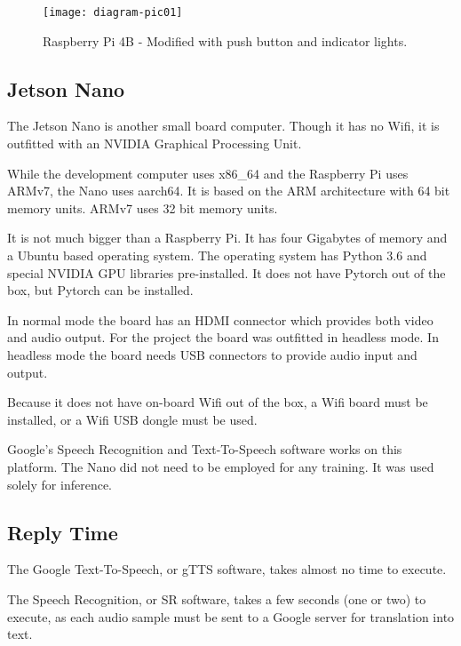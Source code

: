 \begin{figure}[H]
	\begin{center}
		\texttt{[image: diagram-pic01]}
		
		
	\end{center}
	\caption[Raspberry Pi]{Raspberry Pi 4B - Modified with push button and indicator lights.}
	
	
\end{figure}

\subsection{Jetson Nano}

The Jetson Nano is another small board computer. Though it has no Wifi, it is outfitted with an NVIDIA Graphical Processing Unit. 

While the development computer uses x86\_64 and the Raspberry Pi uses ARMv7, the Nano uses aarch64. It is based on the ARM architecture with 64 bit memory units. ARMv7 uses 32 bit memory units.

It is not much bigger than a Raspberry Pi. It has four Gigabytes of memory and a Ubuntu based operating system. The operating system has Python 3.6 and special NVIDIA GPU libraries pre-installed. It does not have Pytorch out of the box, but Pytorch can be installed.

In normal mode the board has an HDMI connector which provides both video and audio output. For the project the board was outfitted in headless mode. In headless mode the board needs USB connectors to provide audio input and output.

Because it does not have on-board Wifi out of the box, a Wifi board must be installed, or a Wifi USB dongle must be used.

Google's Speech Recognition and Text-To-Speech software works on this platform. The Nano did not need to be employed for any training. It was used solely for inference.



\subsection{Reply Time}

The Google Text-To-Speech, or gTTS software, takes almost no time to execute.

The Speech Recognition, or SR software, takes a few seconds (one or two) to execute, as each audio sample must be sent to a Google server for translation into text.

